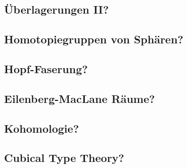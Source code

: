 \subsection{Überlagerungen II?}
\subsection{Homotopiegruppen von Sphären?}
\subsection{Hopf-Faserung?}
\subsection{Eilenberg-MacLane Räume?}
\subsection{Kohomologie?}
\subsection{Cubical Type Theory?}
